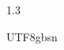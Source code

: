 \documentclass[11pt,a4paper]{article}
\begin{document}
\begin{spacing}{1.3}
\begin{CJK*}{UTF8}{gbsn}
\end{CJK*}
%
\end{spacing}
\end{document}
